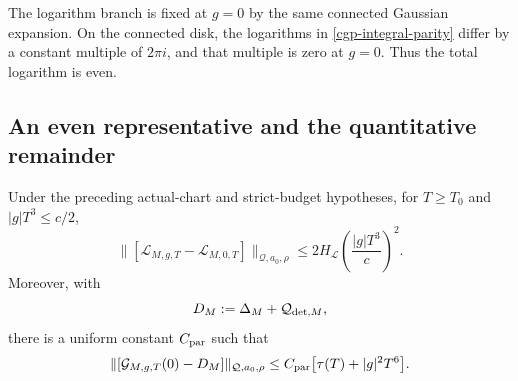 The logarithm branch is fixed at $g=0$ by the same connected
Gaussian expansion. On the connected disk, the logarithms
in \eqref{cgp-integral-parity} differ by a constant multiple
of $2\pi i$, and that multiple is zero at $g=0$. Thus the
total logarithm is even.

\subsection{An even representative and the quantitative remainder}
\label{cgp-estimate-section}

\begin{theorem}
\label{cgp-theorem}
Under the preceding actual-chart and strict-budget hypotheses,
for $T\ge T_0$ and $|g|T^3\le c/2$,
\begin{equation}
 \|[\mathcal L_{M,g,T}-\mathcal L_{M,0,T}]
                     \|_{\mathcal Q,a_0,\rho}
       \le 2H_{\mathcal L}
                       \left(\frac{|g|T^3}{c}\right)^2.
 \label{cgp-even-bound}
\end{equation}
Moreover, with
\begin{equation}
                D_M:=\Delta_M+\mathcal Q_{{\rm det},M},
 \label{cgp-leading-definition}
\end{equation}
there is a uniform constant $C_{\rm par}$ such that
\begin{equation}
 \|[\mathcal G_{M,g,T}(0)-D_M]\|_{\mathcal Q,a_0,\rho}
                 \le C_{\rm par}\bigl[\tau(T)+|g|^2T^6\bigr].
 \label{cgp-leading-bound}
\end{equation}
\end{theorem}
